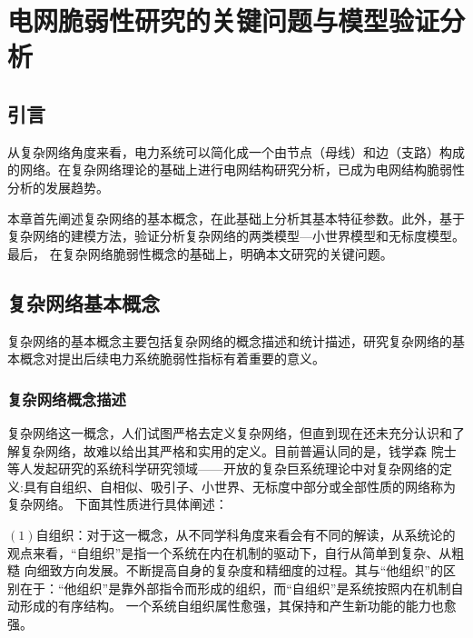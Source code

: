 \chapter{电网脆弱性研究的关键问题与模型验证分析}
\label{cha:model}

\section{引言}
\label{sec:index2}
从复杂网络角度来看，电力系统可以简化成一个由节点（母线）和边（支路）构成的网络。在复杂网络理论的基础上进行电网结构研究分析，已成为电网结构脆弱性分析的发展趋势。

本章首先阐述复杂网络的基本概念，在此基础上分析其基本特征参数。此外，基于复杂网络的建模方法，验证分析复杂网络的两类模型—小世界模型和无标度模型。最后，
在复杂网络脆弱性概念的基础上，明确本文研究的关键问题。

\section{复杂网络基本概念}
\label{sec:powersys}
复杂网络的基本概念主要包括复杂网络的概念描述和统计描述，研究复杂网络的基本概念对提出后续电力系统脆弱性指标有着重要的意义。

\subsection{复杂网络概念描述}
\label{sec:composite}
复杂网络这一概念，人们试图严格去定义复杂网络，但直到现在还未充分认识和了解复杂网络，故难以给出其严格和实用的定义\cite{refs31}。目前普遍认同的是，钱学森
院士等人发起研究的系统科学研究领域——开放的复杂巨系统理论中对复杂网络的定义:具有自组织、自相似、吸引子、小世界、无标度中部分或全部性质的网络称为复杂网络\cite{refs83}。
下面其性质进行具体阐述：

$(1)$自组织：对于这一概念，从不同学科角度来看会有不同的解读，从系统论的观点来看，“自组织”是指一个系统在内在机制的驱动下，自行从简单到复杂、从粗糙
向细致方向发展。不断提高自身的复杂度和精细度的过程。其与“他组织”的区别在于：“他组织”是靠外部指令而形成的组织，而“自组织”是系统按照内在机制自动形成的有序结构。
一个系统自组织属性愈强，其保持和产生新功能的能力也愈强。

